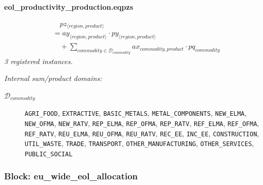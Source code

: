 \documentclass[11pt]{article}
\begin{document}
\paragraph{eol\_productivity\_production.eqpzs}
\begin{align*}
&\quad pz_{\langle region, product\rangle}\\
&= ay_{\langle region, product\rangle} \cdot py_{\langle region, product\rangle}\\
&\quad {}+ \sum_{commodity \in \mathcal{D}_{commodity}} ax_{commodity,product} \cdot pq_{commodity}
\end{align*}
\noindent\emph{3 registered instances.}\par
\noindent\emph{Internal sum/product domains:}\par
\begin{description}
\item[\(\mathcal{D}_{commodity}\)] \texttt{AGRI\_FOOD}, \texttt{EXTRACTIVE}, \texttt{BASIC\_METALS}, \texttt{METAL\_COMPONENTS}, \texttt{NEW\_ELMA}, \texttt{NEW\_OFMA}, \texttt{NEW\_RATV}, \texttt{REP\_ELMA}, \texttt{REP\_OFMA}, \texttt{REP\_RATV}, \texttt{REF\_ELMA}, \texttt{REF\_OFMA}, \texttt{REF\_RATV}, \texttt{REU\_ELMA}, \texttt{REU\_OFMA}, \texttt{REU\_RATV}, \texttt{REC\_EE}, \texttt{INC\_EE}, \texttt{CONSTRUCTION}, \texttt{UTIL\_WASTE}, \texttt{TRADE}, \texttt{TRANSPORT}, \texttt{OTHER\_MANUFACTURING}, \texttt{OTHER\_SERVICES}, \texttt{PUBLIC\_SOCIAL}
\end{description}
\subsubsection*{Block: eu\_wide\_eol\_allocation}
\end{document}
